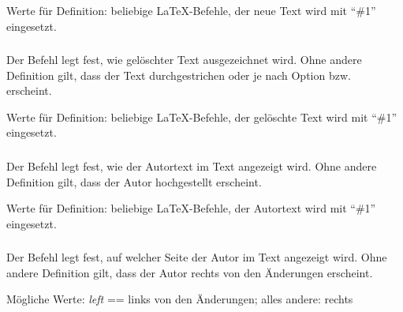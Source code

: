 Werte für Definition: beliebige \LaTeX-Befehle, der neue Text wird mit "`\#1"' eingesetzt.




\subsubsection{}
\DescribeMacro{\setdeletedmarkup}

Der Befehl  legt fest, wie gelöschter Text ausgezeichnet wird.
Ohne andere Definition gilt, dass der Text durchgestrichen oder je nach Option  bzw.\  erscheint.

Werte für Definition: beliebige \LaTeX-Befehle, der gelöschte Text wird mit "`\#1"' eingesetzt.




\subsubsection{}
\DescribeMacro{\setauthormarkup}

Der Befehl  legt fest, wie der Autortext im Text angezeigt wird.
Ohne andere Definition gilt, dass der Autor hochgestellt erscheint.

Werte für Definition: beliebige \LaTeX-Befehle, der Autortext wird mit "`\#1"' eingesetzt.




\subsubsection{}
\DescribeMacro{\setauthormarkupposition}

Der Befehl  legt fest, auf welcher Seite der Autor im Text angezeigt wird.
Ohne andere Definition gilt, dass der Autor rechts von den Änderungen erscheint.

Mögliche Werte: \emph{left} == links von den Änderungen; alles andere: rechts




\subsubsection{}
\DescribeMacro{\setauthormarkuptext}

